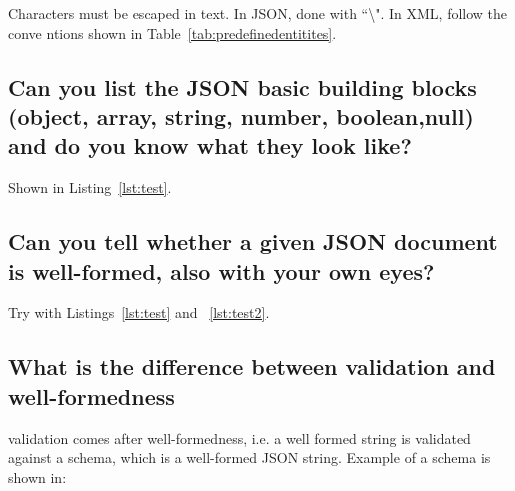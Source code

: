\documentclass{article}
\begin{document}
Characters must be escaped in text. In JSON, done with ``\textbackslash". In XML, follow the conve
ntions shown in Table~\ref{tab:predefinedentitites}.

\subsection{Can you list the JSON basic building blocks (object, array, string, number, boolean,null) and do you know what they look like?}

Shown in Listing~\ref{lst:test}.

\subsection{Can you tell whether a given JSON document is well-formed, also with your own eyes?}

Try with Listings~\ref{lst:test} and ~\ref{lst:test2}.

\subsection{What is the difference between validation and well-formedness}

validation comes after well-formedness, i.e. a well formed string is validated against a schema, which is a well-formed JSON string. Example of a schema is shown in:
\end{document}
